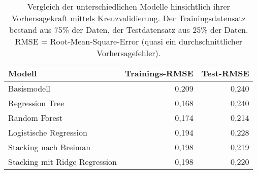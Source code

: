 \begin{table}[H]
    \caption{Vergleich der unterschiedlichen Modelle hinsichtlich ihrer Vorhersagekraft mittels Kreuzvalidierung. Der Trainingsdatensatz bestand aus 75\% der Daten, der Testdatensatz aus 25\% der Daten. RMSE =  Root-Mean-Square-Error (quasi ein durchschnittlicher Vorhersagefehler).}
    \centering
    \label{tab:n:Mcomparison}
    \begin{tabular}{l|rr}
        \toprule
        Modell  & Trainings-RMSE & Test-RMSE \\
        \midrule
        Basismodell                     & 0,209     & 0,240 \\ 
        Regression Tree                 & 0,168     & 0,240\\ 
        Random Forest                   & 0,174     & 0,214\\ 
        Logistische Regression          & 0,194     & 0,228\\ 
        Stacking nach Breiman           & 0,198     & 0,219\\ 
        Stacking mit Ridge Regression   & 0,198     & 0,220\\ 
        \bottomrule
    \end{tabular}
\end{table}